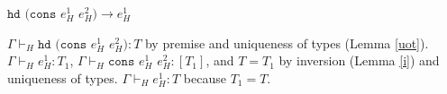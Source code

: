 \begin{case}
$\mathtt{hd}$ $(\mathtt{cons}$ $e_{H}^{1}$ $e_{H}^{2})\rightarrow e_{H}^{1}$

$\Gamma\vdash_{H}\mathtt{hd}$ $(\mathtt{cons}$ $e_{H}^{1}$ $e_{H}^{2}):T$ by premise and uniqueness of types (Lemma \ref{uot}).  $\Gamma\vdash_{H}e_{H}^{1}:T_{1}$, $\Gamma\vdash_{H}\mathtt{cons}$ $e_{H}^{1}$ $e_{H}^{2}:[T_{1}]$, and $T=T_{1}$ by inversion (Lemma \ref{i}) and uniqueness of types.  $\Gamma\vdash_{H}e_{H}^{1}:T$ because $T_{1}=T$.
\end{case}